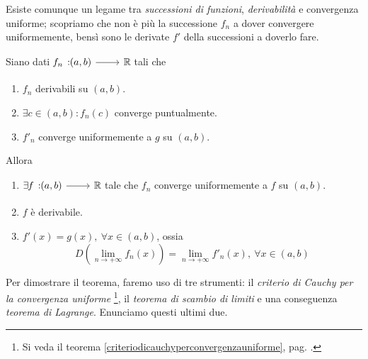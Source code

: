 Esiste comunque un legame tra \textit{successioni di funzioni}, \textit{derivabilità} e convergenza uniforme; scopriamo che non è più la successione $f_n$ a dover convergere uniformemente, bensì sono le derivate $f'$ della successioni a doverlo fare.
\begin{theorema}
	Siano dati $\funz{f_n}{\left(a,b\right)}{\realset}$ tali che
	\begin{enumerate}[label=\alph*.]
		\item $f_n$ derivabili su $\left(a,b\right)$.
		\item $\exists c\in\left(a,b\right)\colon f_n\left(c\right)$ converge puntualmente.
		\item $f'_n$ converge uniformemente a $g$ su $\left(a,b\right)$.
	\end{enumerate}
Allora
\begin{enumerate}
	\item $\exists\funz{f}{\left(a,b\right)}{\realset}$ tale che $f_n$ converge uniformemente a $f$ su $\left(a,b\right)$.
	\item $f$ è derivabile.
	\item $f'(x)=g(x),\ \forall x\in \left(a,b\right)$, ossia
	\begin{equation}
		D\left(\lim_{n\to+\infty}f_n(x)\right)=\lim_{n\to+\infty}f'_n(x),\ \forall x\in\left(a,b\right)
	\end{equation}
\end{enumerate}
\end{theorema}
Per dimostrare il teorema, faremo uso di tre strumenti: il \textit{criterio di Cauchy per la convergenza uniforme} \footnote{Si veda il teorema \ref{criteriodicauchyperconvergenzauniforme}, pag. \pageref{criteriodicauchyperconvergenzauniforme}.}, il \textit{teorema di scambio di limiti} e una conseguenza \textit{teorema di Lagrange}. Enunciamo questi ultimi due.
